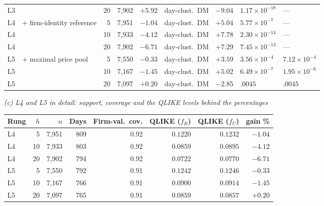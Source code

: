 \begin{table}[p]
\begin{tabular}{@{}llrrrlrll@{}}
L3 & & 20 & 7{,}902 & $+5.92$ & day-clust.\ DM & $-9.04$ & $1.17\times10^{-18}$ & --- \\
\addlinespace
L4 & $+$ firm-identity reference &  5 & 7{,}951 & $-1.04$ & day-clust.\ DM & $+5.04$ & $5.77\times10^{-7}$ & --- \\
L4 & & 10 & 7{,}933 & $-4.12$ & day-clust.\ DM & $+7.78$ & $2.30\times10^{-14}$ & --- \\
L4 & & 20 & 7{,}902 & $-6.71$ & day-clust.\ DM & $+7.29$ & $7.45\times10^{-13}$ & --- \\
\addlinespace
L5 & $+$ maximal price pool &  5 & 7{,}550 & $-0.33$ & day-clust.\ DM & $+3.59$ & $3.56\times10^{-4}$ & $7.12\times10^{-4}$ \\
L5 & & 10 & 7{,}167 & $-1.45$ & day-clust.\ DM & $+5.02$ & $6.49\times10^{-7}$ & $1.95\times10^{-6}$ \\
L5 & & 20 & 7{,}097 & $+0.20$ & day-clust.\ DM & $-2.85$ & $.0045$ & $.0045$ \\
\bottomrule
\end{tabular}

\vspace{1.2ex}
\emph{(c) L4 and L5 in detail: support, coverage and the QLIKE levels behind the percentages}\\[0.4ex]
\begin{tabular}{@{}lrrrrrrr@{}}
\toprule
Rung & $h$ & $n$ & Days & Firm-val.\ cov. & QLIKE ($f_R$) & QLIKE ($f_U$) & gain \% \\
\midrule
L4 &  5 & 7{,}951 & 809 & 0.92 & $0.1220$ & $0.1232$ & $-1.04$ \\
L4 & 10 & 7{,}933 & 803 & 0.92 & $0.0859$ & $0.0895$ & $-4.12$ \\
L4 & 20 & 7{,}902 & 794 & 0.92 & $0.0722$ & $0.0770$ & $-6.71$ \\
\addlinespace
L5 &  5 & 7{,}550 & 792 & 0.91 & $0.1242$ & $0.1246$ & $-0.33$ \\
L5 & 10 & 7{,}167 & 766 & 0.91 & $0.0900$ & $0.0914$ & $-1.45$ \\
L5 & 20 & 7{,}097 & 765 & 0.91 & $0.0859$ & $0.0857$ & $+0.20$ \\
\bottomrule
\end{tabular}
\end{table}

